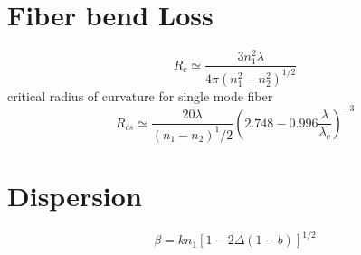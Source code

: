 \documentclass[12pt, onecolumn]{article}
\begin{document}
\section{Fiber bend Loss}
    \begin{equation}
        R_c \simeq \displaystyle\frac{3n_1^2\lambda}{4\pi(n_1^2-n_2^2)^{1/2}}
        \label{eq:crit_radius}
    \end{equation}
    critical radius of curvature for single mode fiber
    \begin{equation}
        R_{cs} \simeq \displaystyle\frac{20\lambda}{(n_1 - n_2)^1/2} \left( 2.748 - 0.996 \displaystyle\frac{\lambda}{\lambda_c} \right)^{-3}
        \label{eq:crit_single_radius}
    \end{equation}

\section{Dispersion}
    \begin{equation}
        \beta = kn_1 [1-2\Delta(1-b)]^{1/2}
        \label{eq:beta}
    \end{equation}
\end{document}
